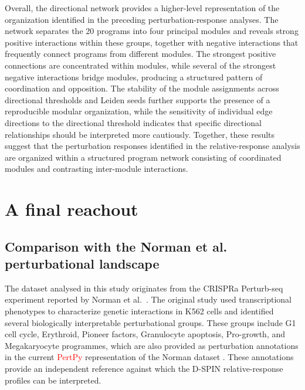 \documentclass[11pt,a4paper]{article}
\begin{document}
Overall, the directional network provides a higher-level representation of the organization identified in the preceding perturbation-response analyses. The network separates the 20 programs into four principal modules and reveals strong positive interactions within these groups, together with negative interactions that frequently connect programs from different modules. The strongest positive connections are concentrated within modules, while several of the strongest negative interactions bridge modules, producing a structured pattern of coordination and opposition. The stability of the module assignments across directional thresholds and Leiden seeds further supports the presence of a reproducible modular organization, while the sensitivity of individual edge directions to the directional threshold indicates that specific directional relationships should be interpreted more cautiously. Together, these results suggest that the perturbation responses identified in the relative-response analysis are organized within a structured program network consisting of coordinated modules and contrasting inter-module interactions.


\newpage

\section{A final reachout}


\subsection{Comparison with the Norman et al. perturbational landscape}

The dataset analysed in this study originates from the CRISPRa Perturb-seq experiment reported by Norman et al.~\citep{Norman2019}. The original study used transcriptional phenotypes to characterize genetic interactions in K562 cells and identified several biologically interpretable perturbational groups. These groups include G1 cell cycle, Erythroid, Pioneer factors, Granulocyte apoptosis, Pro-growth, and Megakaryocyte programmes, which are also provided as perturbation annotations in the current \textcolor{red}{PertPy} representation of the Norman dataset \citep{Heumos2026}. These annotations provide an independent reference against which the D-SPIN relative-response profiles can be interpreted.
\end{document}
